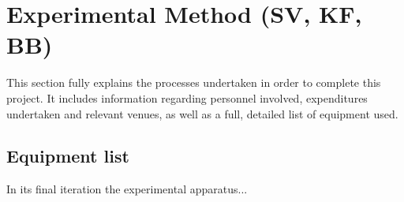 \section{Experimental Method (SV, KF, BB)}

This section fully explains the processes undertaken in order to complete this project. It includes  information regarding personnel involved, expenditures undertaken and relevant venues, as well as a full, detailed list of equipment used.

\subsection{Equipment list}

In its final iteration the experimental apparatus...

